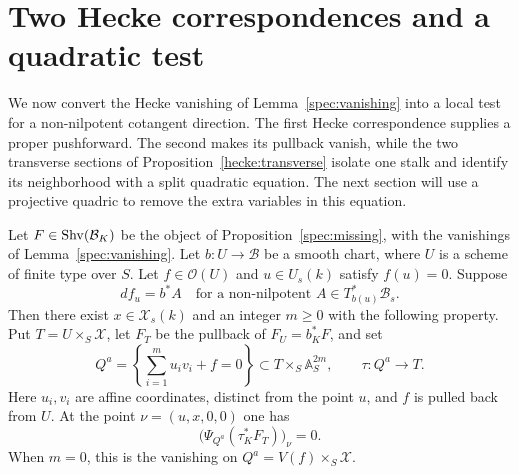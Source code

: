 \section{Two Hecke correspondences and a quadratic test}
\label{sec:twohecke}

We now convert the Hecke vanishing of Lemma~\ref{spec:vanishing}
into a local test for a non-nilpotent cotangent direction.
The first Hecke correspondence supplies a proper pushforward.
The second makes its pullback vanish, while the two transverse
sections of Proposition~\ref{hecke:transverse} isolate one stalk
and identify its neighborhood with a split quadratic equation.
The next section will use a projective quadric to remove the
extra variables in this equation.

\begin{proposition}
\label{two:vertex}
Let $F\in\operatorname{Shv}(\mathcal B_K)$ be the object of
Proposition~\ref{spec:missing}, with the vanishings of
Lemma~\ref{spec:vanishing}. Let $b:U\to\mathcal B$ be a smooth
chart, where $U$ is a scheme of finite type over $S$.
Let $f\in\mathcal O(U)$ and $u\in U_s(k)$ satisfy $f(u)=0$.
Suppose
\[
 df_u=b^*A
 \quad\text{for a non-nilpotent }A\in T^*_{b(u)}\mathcal B_s.
\]
Then there exist $x\in\mathscr X_s(k)$ and an integer $m\geq0$
with the following property. Put $T=U\times_S\mathscr X$,
let $F_T$ be the pullback of $F_U=b_K^*F$, and set
\[
 Q^a=\left\{\sum_{i=1}^m u_i v_i+f=0\right\}
       \subset T\times_S\mathbb A_S^{2m},
 \qquad \tau:Q^a\longrightarrow T.
\]
Here $u_i,v_i$ are affine coordinates, distinct from the point $u$,
and $f$ is pulled back from $U$. At the point
$\nu=(u,x,0,0)$ one has
\begin{equation}
 \label{eq:two-vertex}
 \bigl(\Psi_{Q^a}(\tau_K^*F_T)\bigr)_\nu=0.
\end{equation}
When $m=0$, this is the vanishing on
$Q^a=V(f)\times_S\mathscr X$.
\end{proposition}

